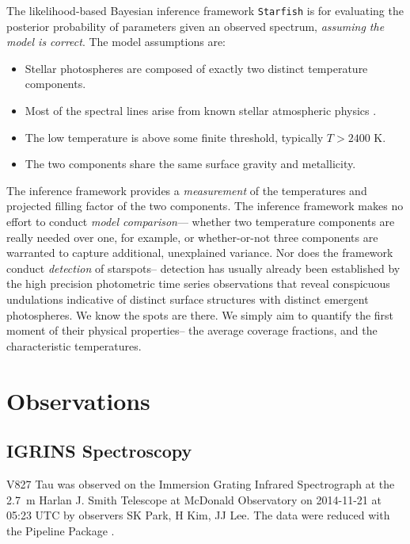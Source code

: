 \documentclass[twocolumn]{emulateapj}%
\begin{document}
The likelihood-based Bayesian inference framework \texttt{Starfish} is for evaluating the posterior probability of parameters given an observed spectrum, \emph{assuming the model is correct}.  The model assumptions are:

\begin{itemize}
  \item Stellar photospheres are composed of exactly two distinct temperature components.
  \item Most of the spectral lines arise from known stellar atmospheric physics \citep{husser13}.
  \item The low temperature is above some finite threshold, typically $T>2400$ K.
  \item The two components share the same surface gravity and metallicity.
\end{itemize}

The inference framework provides a \emph{measurement} of the temperatures and projected filling factor of the two components.  The inference framework makes no effort to conduct \emph{model comparison}--- whether two temperature components are really needed over one, for example, or whether-or-not three components are warranted to capture additional, unexplained variance.  Nor does the framework conduct \emph{detection} of starspots-- detection has usually already been established by the high precision photometric time series observations that reveal conspicuous undulations indicative of distinct surface structures with distinct emergent photospheres.  We know the spots are there.  We simply aim to quantify the first moment of their physical properties-- the average coverage fractions, and the characteristic temperatures.



\section{Observations}\label{sec:obs}

\subsection{IGRINS Spectroscopy}\label{sec:igrins}

V827 Tau was observed on the Immersion Grating Infrared Spectrograph \citep[IGRINS]{park14} at the 2.7~m Harlan J. Smith Telescope at McDonald Observatory on 2014-11-21 at 05:23 UTC by observers SK Park, H Kim, JJ Lee.  The data were reduced with the Pipeline Package \citep{jaejoonlee15}.
\end{document}
